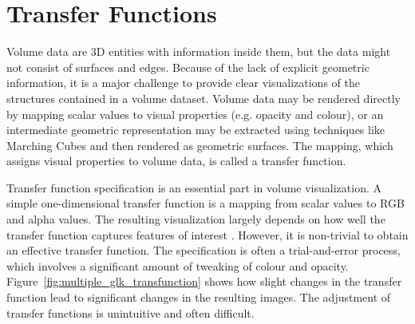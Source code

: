 


\section{Transfer Functions \label{literature_of_transfer_function}}
Volume data are 3D entities with information inside them, but the data might not consist of surfaces and edges.
Because of the lack of explicit geometric information, %
it is a major challenge to provide clear visualizations of the structures contained in a volume dataset.
Volume data may be rendered directly by mapping scalar values to visual properties (e.g. opacity and colour), or an intermediate geometric representation may be extracted using techniques like Marching Cubes \cite{lorensen_marching_1987} and then rendered as geometric surfaces. The mapping, which assigns visual properties to volume data, is called a transfer function.

Transfer function specification is an essential part in volume visualization.
A simple one-dimensional transfer function is a mapping from scalar values to RGB and alpha values.
The resulting visualization largely depends on how well the transfer function captures features of interest \cite{kniss_multidimensional_2002}.
However, it is non-trivial to obtain an effective transfer function. The specification is often a trial-and-error process, which involves a significant amount of tweaking of colour and opacity. Figure~\ref{fig:multiple_glk_transfunction} shows how slight changes in the transfer function lead to significant changes in the resulting images. The adjustment of transfer functions is unintuitive and often difficult.

